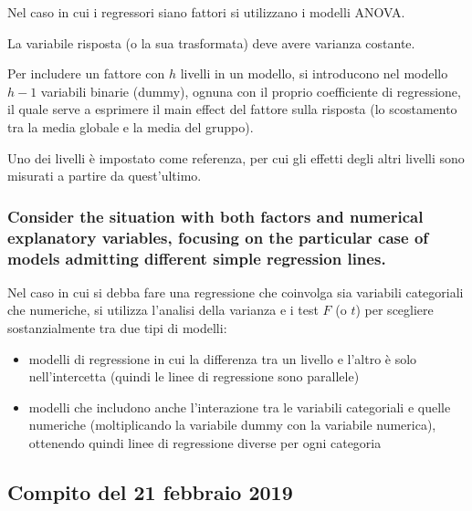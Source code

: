 \documentclass[
]{article}
\begin{document}
Nel caso in cui i regressori siano fattori si utilizzano i modelli
ANOVA.

La variabile risposta (o la sua trasformata) deve avere varianza
costante.

Per includere un fattore con \(h\) livelli in un modello, si introducono
nel modello \(h-1\) variabili binarie (dummy), ognuna con il proprio
coefficiente di regressione, il quale serve a esprimere il main effect
del fattore sulla risposta (lo scostamento tra la media globale e la
media del gruppo).

Uno dei livelli è impostato come referenza, per cui gli effetti degli
altri livelli sono misurati a partire da quest'ultimo.

\hypertarget{consider-the-situation-with-both-factors-and-numerical-explanatory-variables-focusing-on-the-particular-case-of-models-admitting-different-simple-regression-lines.}{%
\subsubsection{Consider the situation with both factors and numerical
explanatory variables, focusing on the particular case of models
admitting different simple regression
lines.}\label{consider-the-situation-with-both-factors-and-numerical-explanatory-variables-focusing-on-the-particular-case-of-models-admitting-different-simple-regression-lines.}}

Nel caso in cui si debba fare una regressione che coinvolga sia
variabili categoriali che numeriche, si utilizza l'analisi della
varianza e i test \(F\) (o \(t\)) per scegliere sostanzialmente tra due
tipi di modelli:

\begin{itemize}
\item
  modelli di regressione in cui la differenza tra un livello e l'altro è
  solo nell'intercetta (quindi le linee di regressione sono parallele)
\item
  modelli che includono anche l'interazione tra le variabili categoriali
  e quelle numeriche (moltiplicando la variabile dummy con la variabile
  numerica), ottenendo quindi linee di regressione diverse per ogni
  categoria
\end{itemize}

\hypertarget{compito-del-21-febbraio-2019}{%
\subsection{Compito del 21 febbraio
2019}\label{compito-del-21-febbraio-2019}}
\end{document}
